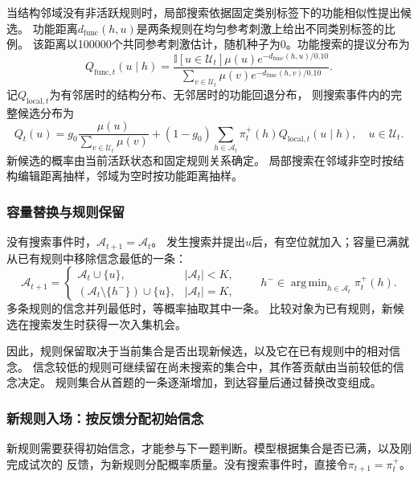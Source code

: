 \documentclass[11pt,a4paper]{article}
\numberwithin{equation}{section}
\newcommand{\ind}{\mathbb{I}}
\newcommand{\A}{\mathcal{A}}
\DeclareMathOperator*{\argmin}{arg\,min}
\begin{document}
当结构邻域没有非活跃规则时，局部搜索依据固定类别标签下的功能相似性提出候选。
功能距离$d_{\mathrm{func}}(h,u)$是两条规则在均匀参考刺激上给出不同类别标签的比例。
该距离以100000个共同参考刺激估计，随机种子为0。功能搜索的提议分布为
\begin{equation}
Q_{\mathrm{func},t}(u\mid h)=
\frac{\ind[u\in\mathcal U_t]\mu(u)e^{-d_{\mathrm{func}}(h,u)/0.10}}
{\sum_{v\in\mathcal U_t}\mu(v)e^{-d_{\mathrm{func}}(h,v)/0.10}}.
\end{equation}
记$Q_{\mathrm{local},t}$为有邻居时的结构分布、无邻居时的功能回退分布，
则搜索事件内的完整候选分布为
\begin{equation}
Q_t(u)=g_0\frac{\mu(u)}{\sum_{v\in\mathcal U_t}\mu(v)}
+(1-g_0)\sum_{h\in\A_t}\pi_t^+(h)Q_{\mathrm{local},t}(u\mid h),
\quad u\in\mathcal U_t.
\label{eq:proposal}
\end{equation}
新候选的概率由当前活跃状态和固定规则关系确定。
局部搜索在邻域非空时按结构编辑距离抽样，邻域为空时按功能距离抽样。

\subsubsection{容量替换与规则保留}
\label{sec:replacement}
没有搜索事件时，$\A_{t+1}=\A_t$。
发生搜索并提出$u$后，有空位就加入；容量已满就从已有规则中移除信念最低的一条：
\begin{equation}
\A_{t+1}=\begin{cases}
\A_t\cup\{u\},&|\A_t|<K,\\
(\A_t\setminus\{h^-\})\cup\{u\},&|\A_t|=K,
\end{cases}
\qquad h^-\in\argmin_{h\in\A_t}\pi_t^+(h).
\label{eq:replacement}
\end{equation}
多条规则的信念并列最低时，等概率抽取其中一条。
比较对象为已有规则，新候选在搜索发生时获得一次入集机会。

因此，规则保留取决于当前集合是否出现新候选，以及它在已有规则中的相对信念。
信念较低的规则可继续留在尚未搜索的集合中，其作答贡献由当前较低的信念决定。
规则集合从首题的一条逐渐增加，到达容量后通过替换改变组成。


\subsubsection{新规则入场：按反馈分配初始信念}
\label{sec:admission}
新规则需要获得初始信念，才能参与下一题判断。模型根据集合是否已满，以及刚完成试次的
反馈，为新规则分配概率质量。没有搜索事件时，直接令$\pi_{t+1}=\pi_t^+$。
\end{document}
